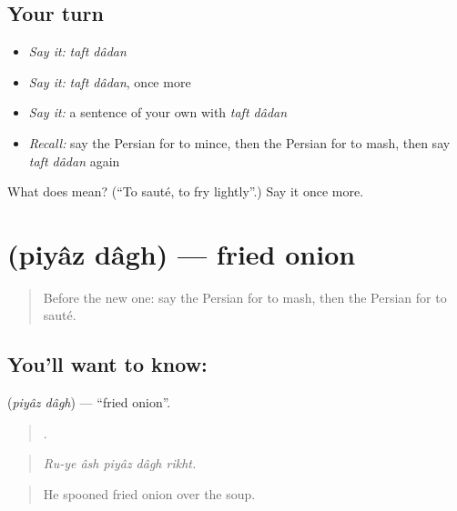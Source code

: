 \subsection*{Your turn}
\begin{itemize}
\raggedright
  \item \emph{Say it:} \emph{taft dâdan}
  \item \emph{Say it:} \emph{taft dâdan}, once more
  \item \emph{Say it:} a sentence of your own with \emph{taft dâdan}
  \item \emph{Recall:} say the Persian for to mince, then the Persian for to mash, then say \emph{taft dâdan} again
\end{itemize}

\begin{tcolorbox}[breakable,colback=teal!4,colframe=teal!35!black,title={Before you move on}]
What does   mean? (\textquotedblleft{}To sauté, to fry lightly\textquotedblright{}.) Say it once more.
\end{tcolorbox}
\section[\texorpdfstring{\fa{پیاز} \fa{داغ} (piyâz dâgh)}{پیاز داغ (piyâz dâgh)}]{  (piyâz dâgh) — fried onion}

\label{lesson:FA-C356-piyaz-dagh}



\begin{quote}
Before the new one: say the Persian for to mash, then the Persian for to sauté.
\end{quote}

\subsection*{You'll want to know:  }
\textbf{ } (\emph{piyâz dâgh}) — \textquotedblleft{}fried onion\textquotedblright{}.

\begin{quote}
    .
\end{quote}

\begin{quote}
\emph{Ru-ye âsh piyâz dâgh rikht.}
\end{quote}

\begin{quote}
He spooned fried onion over the soup.
\end{quote}

